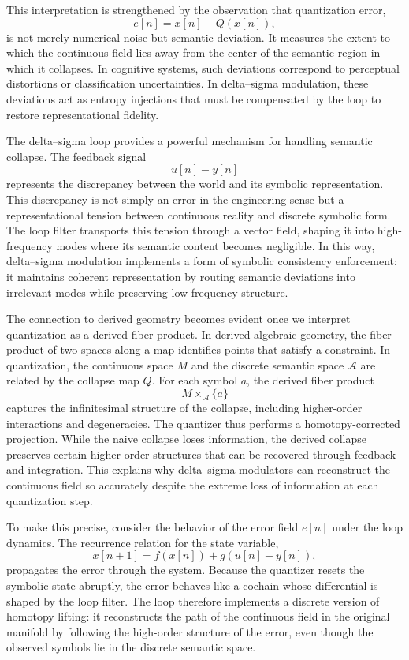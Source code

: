 This interpretation is strengthened by the observation that quantization error,
\[
e[n] = x[n] - Q(x[n]),
\]
is not merely numerical noise but semantic deviation. It measures the extent to which the continuous field lies away from the center of the semantic region in which it collapses. In cognitive systems, such deviations correspond to perceptual distortions or classification uncertainties. In delta–sigma modulation, these deviations act as entropy injections that must be compensated by the loop to restore representational fidelity.

The delta–sigma loop provides a powerful mechanism for handling semantic collapse. The feedback signal 
\[
u[n] - y[n]
\]
represents the discrepancy between the world and its symbolic representation. This discrepancy is not simply an error in the engineering sense but a representational tension between continuous reality and discrete symbolic form. The loop filter transports this tension through a vector field, shaping it into high-frequency modes where its semantic content becomes negligible. In this way, delta–sigma modulation implements a form of symbolic consistency enforcement: it maintains coherent representation by routing semantic deviations into irrelevant modes while preserving low-frequency structure.

The connection to derived geometry becomes evident once we interpret quantization as a derived fiber product. In derived algebraic geometry, the fiber product of two spaces along a map identifies points that satisfy a constraint. In quantization, the continuous space \(M\) and the discrete semantic space \(\mathcal{A}\) are related by the collapse map \(Q\). For each symbol \(a\), the derived fiber product
\[
M \times_{\mathcal{A}} \{a\}
\]
captures the infinitesimal structure of the collapse, including higher-order interactions and degeneracies. The quantizer thus performs a homotopy-corrected projection. While the naive collapse loses information, the derived collapse preserves certain higher-order structures that can be recovered through feedback and integration. This explains why delta–sigma modulators can reconstruct the continuous field so accurately despite the extreme loss of information at each quantization step.

To make this precise, consider the behavior of the error field \(e[n]\) under the loop dynamics. The recurrence relation for the state variable,
\[
x[n+1] = f(x[n]) + g(u[n] - y[n]),
\]
propagates the error through the system. Because the quantizer resets the symbolic state abruptly, the error behaves like a cochain whose differential is shaped by the loop filter. The loop therefore implements a discrete version of homotopy lifting: it reconstructs the path of the continuous field in the original manifold by following the high-order structure of the error, even though the observed symbols lie in the discrete semantic space.

